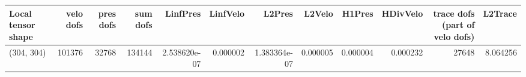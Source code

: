 \begin{tabular}{lrrrrrrrrrrr}
\toprule
Local tensor shape &  velo dofs &  pres dofs &  sum dofs &     LinfPres &  LinfVelo &       L2Pres &   L2Velo &   H1Pres &  HDivVelo &  trace dofs (part of velo dofs) &  L2Trace \\
\midrule
        (304, 304) &     101376 &      32768 &    134144 & 2.538620e-07 &  0.000002 & 1.383364e-07 & 0.000005 & 0.000004 &  0.000232 &                           27648 & 8.064256 \\
\bottomrule
\end{tabular}
